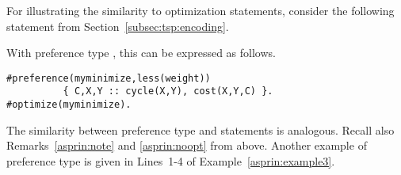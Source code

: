 For illustrating the similarity to optimization statements,
consider the following  statement from Section~\ref{subsec:tsp:encoding}.
%

%
With preference type ,
this can be expressed as follows.
\begin{lstlisting}[numbers=none]
#preference(myminimize,less(weight))
          { C,X,Y :: cycle(X,Y), cost(X,Y,C) }.
#optimize(myminimize).
\end{lstlisting}
The similarity between  preference type  and  statements is analogous.
Recall also Remarks~\ref{asprin:note} and \ref{asprin:noopt} from above.
%
Another example of preference type  is given in Lines~1-4 of Example~\ref{asprin:example3}.


